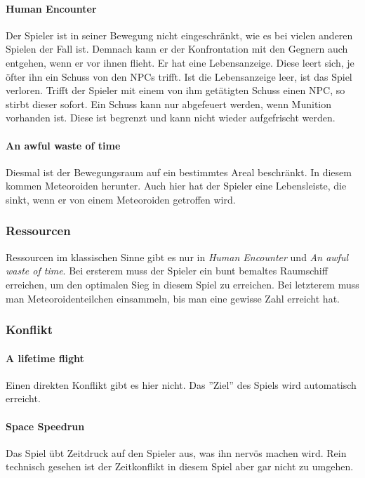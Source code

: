 \documentclass{Ausarbeitung}
\begin{document}
			\paragraph*{Human Encounter}
				Der Spieler ist in seiner Bewegung nicht eingeschränkt, wie es bei vielen anderen Spielen der Fall ist. Demnach kann er der Konfrontation mit den Gegnern auch entgehen, wenn er vor ihnen flieht. Er hat eine Lebensanzeige. Diese leert sich, je öfter ihn ein Schuss von den NPCs trifft. Ist die Lebensanzeige leer, ist das Spiel verloren. Trifft der Spieler mit einem von ihm getätigten Schuss einen NPC, so stirbt dieser sofort. Ein Schuss kann nur abgefeuert werden, wenn Munition vorhanden ist. Diese ist begrenzt und kann nicht wieder aufgefrischt werden.
				
			\paragraph*{An awful waste of time}
				Diesmal ist der Bewegungsraum auf ein bestimmtes Areal beschränkt. In diesem kommen Meteoroiden herunter. Auch hier hat der Spieler eine Lebensleiste, die sinkt, wenn er von einem Meteoroiden getroffen wird. 
			
		\subsubsection{Ressourcen}
			Ressourcen im klassischen Sinne gibt es nur in \textit{Human Encounter} und \textit{An awful waste of time}. Bei ersterem muss der Spieler ein bunt bemaltes Raumschiff erreichen, um den optimalen Sieg in diesem Spiel zu erreichen. Bei letzterem muss man Meteoroidenteilchen einsammeln, bis man eine gewisse Zahl erreicht hat.
			
		\subsubsection{Konflikt}
			\paragraph*{A lifetime flight}
				Einen direkten Konflikt gibt es hier nicht. Das ''Ziel'' des Spiels wird automatisch erreicht.
				
			\paragraph*{Space Speedrun}
				Das Spiel übt Zeitdruck auf den Spieler aus, was ihn nervös machen wird. Rein technisch gesehen ist der Zeitkonflikt in diesem Spiel aber gar nicht zu umgehen.
			
\end{document}

